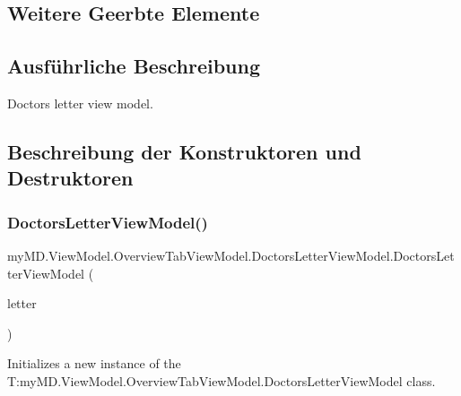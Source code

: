 \subsection*{Weitere Geerbte Elemente}


\subsection{Ausführliche Beschreibung}
Doctors letter view model. 



\subsection{Beschreibung der Konstruktoren und Destruktoren}
\mbox{\label{classmy_m_d_1_1_view_model_1_1_overview_tab_view_model_1_1_doctors_letter_view_model_a587e53a436f0a4472d49493bcdc97f9d}} 
\subsubsection{\texorpdfstring{Doctors\+Letter\+View\+Model()}{DoctorsLetterViewModel()}\hspace{0.1cm}{\footnotesize\ttfamily [1/2]}}
{\footnotesize\ttfamily my\+M\+D.\+View\+Model.\+Overview\+Tab\+View\+Model.\+Doctors\+Letter\+View\+Model.\+Doctors\+Letter\+View\+Model (\begin{DoxyParamCaption}\item[{\mbox{\hyperlink{interfacemy_m_d_1_1_model_interface_1_1_data_model_interface_1_1_i_doctors_letter}{I\+Doctors\+Letter}}}]{letter }\end{DoxyParamCaption})}



Initializes a new instance of the T\+:my\+M\+D.\+View\+Model.\+Overview\+Tab\+View\+Model.\+Doctors\+Letter\+View\+Model class. 


